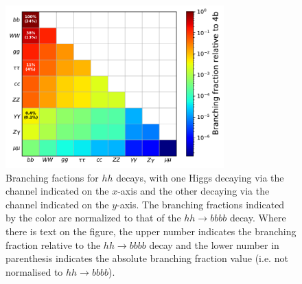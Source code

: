 \begin{figure}[!htb]
    \begin{center}
        \includegraphics[width=0.75\textwidth]{figures/search_hh/hh_br}
        \caption{
            Branching factions for $hh$ decays, with one Higgs decaying via the channel
            indicated on the $x$-axis and the other decaying via the channel indicated on the $y$-axis.
            The branching fractions indicated by the color are normalized to that of the $hh \rightarrow bbbb$
            decay.
            Where there is text on the figure, the upper number indicates the branching fraction
            relative to the $hh\rightarrow bbbb$ decay and the lower number in parenthesis indicates the absolute
            branching fraction value (i.e. not normalised to $hh \rightarrow bbbb$).
        }
        \label{fig:hh_br}
    \end{center}
\end{figure}

